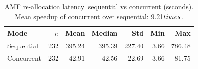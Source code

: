 \begin{table}[htbp]
\centering
\caption{AMF re-allocation latency: sequential vs concurrent (seconds). Mean speedup of concurrent over sequential: 9.21$\\times$.}
\label{tab:comparison}
\begin{tabular}{lrrrrrr}
\hline
Mode & $n$ & Mean & Median & Std & Min & Max \\
\hline
Sequential & 232 & 395.24 & 395.39 & 227.40 & 3.66 & 786.48 \\
Concurrent & 232 & 42.91 & 42.56 & 22.69 & 3.66 & 81.75 \\
\hline
\end{tabular}
\end{table}
